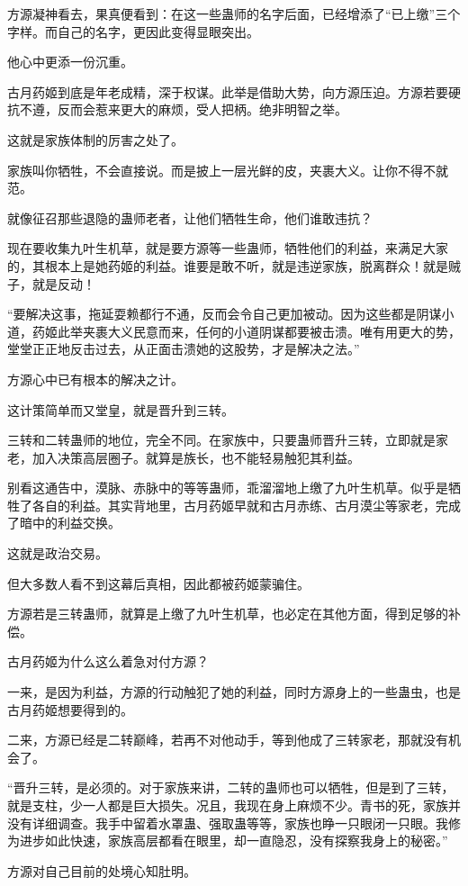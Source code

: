 \begin{this_body}
方源凝神看去，果真便看到：在这一些蛊师的名字后面，已经增添了“已上缴”三个字样。而自己的名字，更因此变得显眼突出。

他心中更添一份沉重。

古月药姬到底是年老成精，深于权谋。此举是借助大势，向方源压迫。方源若要硬抗不遵，反而会惹来更大的麻烦，受人把柄。绝非明智之举。

这就是家族体制的厉害之处了。

家族叫你牺牲，不会直接说。而是披上一层光鲜的皮，夹裹大义。让你不得不就范。

就像征召那些退隐的蛊师老者，让他们牺牲生命，他们谁敢违抗？

现在要收集九叶生机草，就是要方源等一些蛊师，牺牲他们的利益，来满足大家的，其根本上是她药姬的利益。谁要是敢不听，就是违逆家族，脱离群众！就是贼子，就是反动！

“要解决这事，拖延耍赖都行不通，反而会令自己更加被动。因为这些都是阴谋小道，药姬此举夹裹大义民意而来，任何的小道阴谋都要被击溃。唯有用更大的势，堂堂正正地反击过去，从正面击溃她的这股势，才是解决之法。”

方源心中已有根本的解决之计。

这计策简单而又堂皇，就是晋升到三转。

三转和二转蛊师的地位，完全不同。在家族中，只要蛊师晋升三转，立即就是家老，加入决策高层圈子。就算是族长，也不能轻易触犯其利益。

别看这通告中，漠脉、赤脉中的等等蛊师，乖溜溜地上缴了九叶生机草。似乎是牺牲了各自的利益。其实背地里，古月药姬早就和古月赤练、古月漠尘等家老，完成了暗中的利益交换。

这就是政治交易。

但大多数人看不到这幕后真相，因此都被药姬蒙骗住。

方源若是三转蛊师，就算是上缴了九叶生机草，也必定在其他方面，得到足够的补偿。

古月药姬为什么这么着急对付方源？

一来，是因为利益，方源的行动触犯了她的利益，同时方源身上的一些蛊虫，也是古月药姬想要得到的。

二来，方源已经是二转巅峰，若再不对他动手，等到他成了三转家老，那就没有机会了。

“晋升三转，是必须的。对于家族来讲，二转的蛊师也可以牺牲，但是到了三转，就是支柱，少一人都是巨大损失。况且，我现在身上麻烦不少。青书的死，家族并没有详细调查。我手中留着水罩蛊、强取蛊等等，家族也睁一只眼闭一只眼。我修为进步如此快速，家族高层都看在眼里，却一直隐忍，没有探察我身上的秘密。”

方源对自己目前的处境心知肚明。


\end{this_body}
